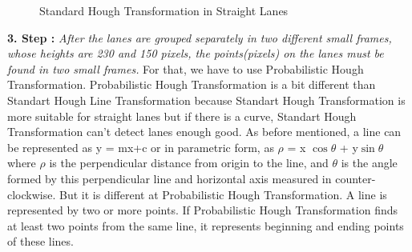 \begin{figure}[H]
  \centering
  \hfill
  \caption{Standard Hough Transformation in Straight Lanes}
\end{figure} 


\textbf{3. Step : }\emph{\color{blue} After the lanes are grouped separately in two different small frames, whose heights are 230 and 150 pixels, the points(pixels) on the lanes must be found in two small frames. }For that, we have to use Probabilistic Hough Transformation. Probabilistic Hough Transformation is a bit different than Standart Hough Line Transformation because Standart Hough Transformation is more suitable for straight lanes but if there is a curve, Standart Hough Transformation can't detect lanes enough good. As before mentioned, a line can be represented as y = mx+c or in parametric form, as $\rho$ = x $\cos \theta$ + y$ \sin \theta$ where  $\rho$ is the perpendicular distance from origin to the line, and $\theta$ is the angle formed by this perpendicular line and horizontal axis measured in counter-clockwise. But it is different at Probabilistic Hough Transformation. A line is represented by two or more points. If Probabilistic Hough Transformation finds at least two points from the same line, it represents beginning and ending points of these lines.

